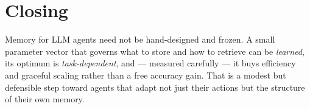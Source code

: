 \section{Closing}
Memory for LLM agents need not be hand-designed and frozen. A small parameter
vector that governs what to store and how to retrieve can be \emph{learned}, its
optimum is \emph{task-dependent}, and --- measured carefully --- it buys
efficiency and graceful scaling rather than a free accuracy gain. That is a
modest but defensible step toward agents that adapt not just their actions but
the structure of their own memory.
